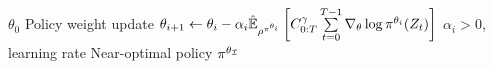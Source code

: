 \documentclass[12pt,twoside]{../../mitthesis}
\begin{document}
\begin{algorithmic}
 $\theta_0$
	\STATE Policy weight update
	\STATE $\theta_{i+1} \la \theta_i - \alpha_i \Es[\trajpdf^{\policy^{\theta_i}}]{ \Cost^\gamma_{0:T} \sum \limits_{t=0}^{T-1} \nabla_\theta \log \policy^{\theta_i} ( \Traj_t ) }$
	\STATE $\alpha_i > 0$, learning rate
\ENDFOR
\STATE \RETURN Near-optimal policy $\policy^{\theta_{\mathcal I}}$
\end{algorithmic}


\printbibliography

%
%
\end{document}
